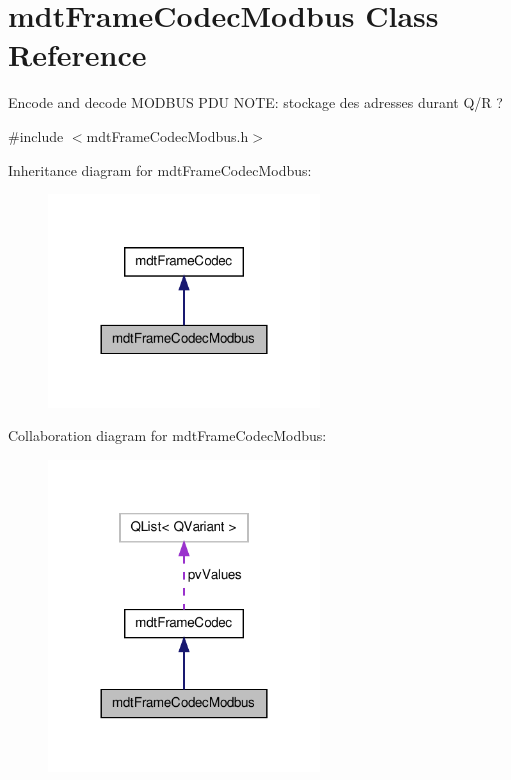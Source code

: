 \hypertarget{classmdt_frame_codec_modbus}{\section{mdt\-Frame\-Codec\-Modbus Class Reference}
\label{classmdt_frame_codec_modbus}
}


Encode and decode M\-O\-D\-B\-U\-S P\-D\-U N\-O\-T\-E\-: stockage des adresses durant Q/\-R ?  




{\ttfamily \#include $<$mdt\-Frame\-Codec\-Modbus.\-h$>$}



Inheritance diagram for mdt\-Frame\-Codec\-Modbus\-:
\nopagebreak
\begin{figure}[H]
\begin{center}
\leavevmode
\includegraphics[width=204pt]{classmdt_frame_codec_modbus__inherit__graph}
\end{center}
\end{figure}


Collaboration diagram for mdt\-Frame\-Codec\-Modbus\-:
\nopagebreak
\begin{figure}[H]
\begin{center}
\leavevmode
\includegraphics[width=204pt]{classmdt_frame_codec_modbus__coll__graph}
\end{center}
\end{figure}
